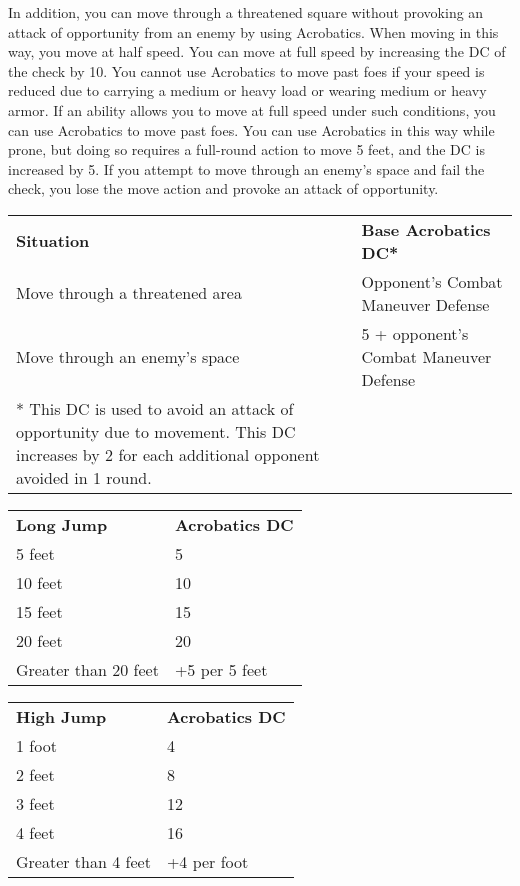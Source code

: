 In addition, you can move through a threatened square without provoking an attack of opportunity from an enemy by using Acrobatics. When moving in this way, you move at half speed. You can move at full speed by increasing the DC of the check by 10. You cannot use Acrobatics to move past foes if your speed is reduced due to carrying a medium or heavy load or wearing medium or heavy armor. If an ability allows you to move at full speed under such conditions, you can use Acrobatics to move past foes. You can use Acrobatics in this way while prone, but doing so requires a full-round action to move 5 feet, and the DC is increased by 5. If you attempt to move through an enemy's space and fail the check, you lose the move action and provoke an attack of opportunity.
\begin{table}
 \sffamily
 \begin{tabular}{ll}
 \textbf{Situation} & \textbf{Base Acrobatics DC*} \\
  Move through a threatened area & Opponent's Combat Maneuver Defense \\
  Move through an enemy's space & 5 + opponent's Combat Maneuver Defense \\
  * This DC is used to avoid an attack of opportunity due to movement. This DC increases by 2 for each additional opponent avoided in 1 round.
 \end{tabular}
\end{table}
\begin{table}
 \sffamily
 \begin{tabular}{ll}
\textbf{Long Jump} & \textbf{Acrobatics DC} \\
5 feet & 5\\
10 feet & 10\\
15 feet & 15\\
20 feet &  20\\
Greater than 20 feet & +5 per 5 feet \\
 \end{tabular}
\end{table}

\begin{table}
\sffamily
\begin{tabular}{ll}
\textbf{High Jump} & \textbf{Acrobatics DC}\\
1 foot & 4\\
2 feet & 8\\
3 feet & 12\\
4 feet & 16\\
Greater than 4 feet & +4 per foot\\
\end{tabular}
\end{table}

